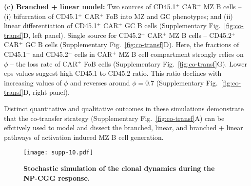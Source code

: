 \documentclass[11pt]{article}
\begin{document}
\textbf{(c) Branched + linear model:}
Two sources of CD45.1$^{+}$ CAR$^{+}$ MZ B cells -- (i) bifurcation of CD45.1$^{+}$ CAR$^{+}$ FoB into MZ and GC phenotypes; and (ii)
linear differentiation of CD45.1$^{+}$ CAR$^{+}$ GC B cells (Supplementary Fig.~\ref{fig:co-transf}D, left panel). 
Single source for CD45.2$^{+}$ CAR$^{+}$  MZ B cells -- CD45.2$^{+}$ CAR$^{+}$ GC B cells (Supplementary Fig.~\ref{fig:co-transf}D).
Here, the fractions of CD45.1$^{+}$ and CD45.2$^{+}$ cells in CAR$^{+}$ MZ B cell compartment strongly relies on $\phi$ -- the loss rate of CAR$^{+}$ FoB cells (Supplementary Fig.~\ref{fig:co-transf}G).
Lower eps values suggest high CD45.1 to CD45.2 ratio. This ratio declines with increasing values of $\phi$ and reverses around $\phi = 0.7$ (Supplementary Fig.~\ref{fig:co-transf}D, right panel).

Distinct quantitative and qualitative outcomes in these simulations demonstrate that the co-transfer strategy (Supplementary Fig.~\ref{fig:co-transf}A) can be effctively used to model and dissect the branched, linear, and branched + linear pathways of activation induced MZ B cell generation.

 
 
\clearpage

\begin{figure}[htbp]
\center
\texttt{[image: supp-10.pdf]}
\caption{
    \textbf{Stochastic simulation of the clonal dynamics during the NP-CGG response.}
    }
       \label{fig:clone-dyn}
       
 \end{figure}
\end{document}
